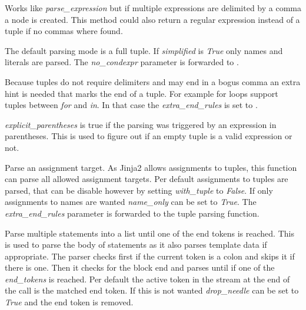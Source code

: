 \documentclass[a4paper,10pt,english]{sphinxmanual}
\begin{document}
\begin{fulllineitems}
\begin{fulllineitems}
\label{extensions:jinja2.parser.Parser.parse_tuple}
Works like \emph{parse\_expression} but if multiple expressions are
delimited by a comma a {\hyperref[extensions:jinja2.nodes.Tuple]{}} node is created.
This method could also return a regular expression instead of a tuple
if no commas where found.

The default parsing mode is a full tuple.  If \emph{simplified} is \emph{True}
only names and literals are parsed.  The \emph{no\_condexpr} parameter is
forwarded to .

Because tuples do not require delimiters and may end in a bogus comma
an extra hint is needed that marks the end of a tuple.  For example
for loops support tuples between \emph{for} and \emph{in}.  In that case the
\emph{extra\_end\_rules} is set to \code{{[}'name:in'{]}}.

\emph{explicit\_parentheses} is true if the parsing was triggered by an
expression in parentheses.  This is used to figure out if an empty
tuple is a valid expression or not.

\end{fulllineitems}


\begin{fulllineitems}
\label{extensions:jinja2.parser.Parser.parse_assign_target}
Parse an assignment target.  As Jinja2 allows assignments to
tuples, this function can parse all allowed assignment targets.  Per
default assignments to tuples are parsed, that can be disable however
by setting \emph{with\_tuple} to \emph{False}.  If only assignments to names are
wanted \emph{name\_only} can be set to \emph{True}.  The \emph{extra\_end\_rules}
parameter is forwarded to the tuple parsing function.

\end{fulllineitems}


\begin{fulllineitems}
\label{extensions:jinja2.parser.Parser.parse_statements}
Parse multiple statements into a list until one of the end tokens
is reached.  This is used to parse the body of statements as it also
parses template data if appropriate.  The parser checks first if the
current token is a colon and skips it if there is one.  Then it checks
for the block end and parses until if one of the \emph{end\_tokens} is
reached.  Per default the active token in the stream at the end of
the call is the matched end token.  If this is not wanted \emph{drop\_needle}
can be set to \emph{True} and the end token is removed.


\end{fulllineitems}
\end{fulllineitems}
\end{document}
